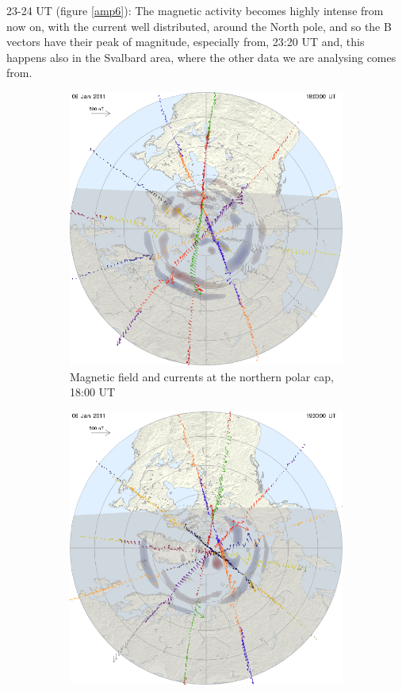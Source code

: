 \documentclass[10pt,a4paper]{article}
\begin{document}
23-24 UT (figure \ref{amp6}): The magnetic activity becomes highly intense from now on, with the current well distributed, around the North pole, and so the B vectors have their peak of magnitude, especially from, 23:20 UT and, this happens also in the Svalbard area, where the other data we are analysing comes from.

\begin{figure}[h]
	\begin{subfigure}[h]{.5\textwidth}
		\centering
		\includegraphics[width=.8\linewidth]{1294336800north.png}
		\caption{Magnetic field and currents at the northern polar cap, 18:00 UT}
		\label{amp1}
	\end{subfigure}
	\begin{subfigure}[h]{.5\textwidth}
		\centering
		\includegraphics[width=.8\linewidth]{1294342200north.png}

\end{subfigure}
\end{figure}
\end{document}
